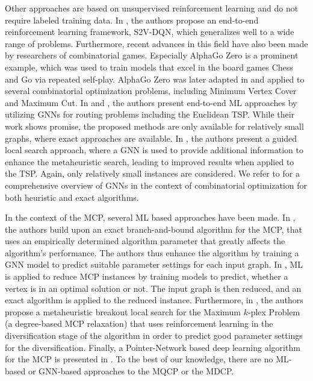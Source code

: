 \documentclass[draft,final]{vutinfth} %
\begin{document}
Other approaches are based on unsupervised reinforcement learning and do not require labeled training data. 
In \cite{Khalil2017}, the authors propose an end-to-end reinforcement learning framework, S2V-DQN, which generalizes well to a wide range of problems. 
Furthermore, recent advances in this field have also been made by researchers of combinatorial games. Especially AlphaGo Zero is a prominent example, which was used to train models that excel in the board games Chess and Go via repeated self-play. AlphaGo Zero was later adapted in \cite{Abe2019} and applied to several combinatorial optimization problems, including Minimum Vertex Cover and Maximum Cut. 
In \cite{Kool2019} and \cite{Joshi2021}, the authors present end-to-end ML approaches by utilizing GNNs for routing problems including the Euclidean TSP. While their work shows promise, the proposed methods are only available for relatively small graphs, where exact approaches are available. In \cite{Hudson2021}, the authors present a guided local search approach, where a GNN is used to provide additional information to enhance the metaheuristic search, leading to improved results when applied to the TSP. Again, only relatively small instances are considered. 
We refer to \cite{Cappart2021} for a comprehensive overview of GNNs in the context of combinatorial optimization for both heuristic and exact algorithms. 

In the context of the MCP, several ML based approaches have been made. In \cite{Kristjan2022}, the authors build upon an exact branch-and-bound algorithm for the MCP, that uses an empirically determined algorithm parameter that greatly affects the algorithm's performance. The authors thus enhance the algorithm by training a GNN model to predict suitable parameter settings for each input graph. 
In \cite{Sun2021}, ML is applied to reduce MCP instances by training models to predict, whether a vertex is in an optimal solution or not. The input graph is then reduced, and an exact algorithm is applied to the reduced instance. 
Furthermore, in \cite{Yan2022}, the authors propose a metaheuristic breakout local search for the Maximum $k$-plex Problem (a degree-based MCP relaxation) that uses reinforcement learning in the diversification stage of the algorithm in order to predict good parameter settings for the diversification. Finally, a Pointer-Network based deep learning algorithm for the MCP is presented in \cite{Gu2020}. 
To the best of our knowledge, there are no ML-based or GNN-based approaches to the MQCP or the MDCP. 
\end{document}
